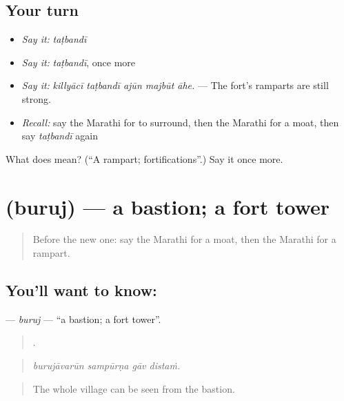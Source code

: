 \subsection*{Your turn}
\begin{itemize}
\raggedright
  \item \emph{Say it:} \emph{taṭbandī}
  \item \emph{Say it:} \emph{taṭbandī}, once more
  \item \emph{Say it:} \emph{killyācī taṭbandī ajūn majbūt āhe.} — The fort's ramparts are still strong.
  \item \emph{Recall:} say the Marathi for to surround, then the Marathi for a moat, then say \emph{taṭbandī} again
\end{itemize}

\begin{tcolorbox}[breakable,colback=teal!4,colframe=teal!35!black,title={Before you move on}]
What does  mean? (\textquotedblleft{}A rampart; fortifications\textquotedblright{}.) Say it once more.
\end{tcolorbox}
\section[\texorpdfstring{\mr{बुरुज} (buruj)}{बुरुज (buruj)}]{ (buruj) — a bastion; a fort tower}

\label{lesson:MR-C331-buruj}



\begin{quote}
Before the new one: say the Marathi for a moat, then the Marathi for a rampart.
\end{quote}

\subsection*{You'll want to know: }
\textbf{} — \emph{buruj} — \textquotedblleft{}a bastion; a fort tower\textquotedblright{}.

\begin{quote}
   .
\end{quote}

\begin{quote}
\emph{burujāvarūn sampūrṇa gāv distaṁ.}
\end{quote}

\begin{quote}
The whole village can be seen from the bastion.
\end{quote}


